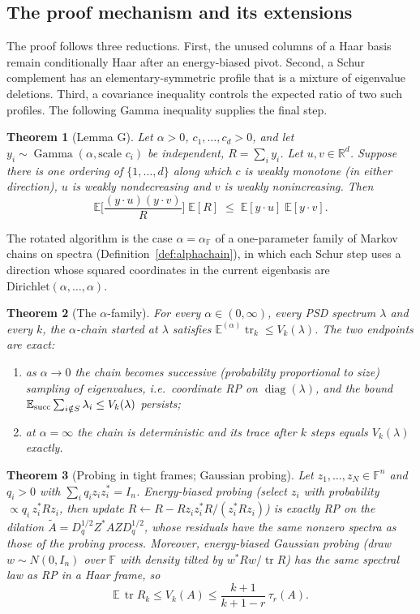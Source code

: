 \documentclass[11pt,a4paper]{article}
\newtheorem{mainthm}{Theorem}
\theoremstyle{definition}
\newcommand{\E}{\mathbb{E}}
\newcommand{\R}{\mathbb{R}}
\newcommand{\F}{\mathbb{F}}
\newcommand{\tr}{\operatorname{tr}}
\newcommand{\diag}{\operatorname{diag}}
\newcommand{\Gam}{\operatorname{Gamma}}
\begin{document}
\subsection{The proof mechanism and its extensions}

The proof follows three reductions. First, the unused columns of a Haar basis remain conditionally Haar after an energy-biased pivot. Second, a Schur complement has an elementary-symmetric profile that is a mixture of eigenvalue deletions. Third, a covariance inequality controls the expected ratio of two such profiles. The following Gamma inequality supplies the final step.

\begin{mainthm}[Lemma G]\label{thm:C}
Let $\alpha>0$, $c_1,\dots,c_d>0$, and let $y_i\sim\Gam(\alpha,\text{scale }c_i)$ be independent, $R=\sum_iy_i$. Let $u,v\in\R^d$. Suppose there is one ordering of $\{1,\dots,d\}$ along which $c$ is weakly monotone (in either direction), $u$ is weakly nondecreasing and $v$ is weakly nonincreasing. Then
\[
\E\Big[\frac{(y\cdot u)(y\cdot v)}{R}\Big]\;\E[R]\;\le\;\E[y\cdot u]\;\E[y\cdot v].
\]
\end{mainthm}

The rotated algorithm is the case $\alpha=\alpha_\F$ of a one-parameter family of Markov chains on spectra (Definition~\ref{def:alphachain}), in which each Schur step uses a direction whose squared coordinates in the current eigenbasis are $\mathrm{Dirichlet}(\alpha,\dots,\alpha)$.

\begin{mainthm}[The $\alpha$-family]\label{thm:D}
For every $\alpha\in(0,\infty)$, every PSD spectrum $\lambda$ and every $k$, the $\alpha$-chain started at $\lambda$ satisfies $\E^{(\alpha)}\tr_k\le V_k(\lambda)$. The two endpoints are exact:
\begin{enumerate}
\item[(i)] as $\alpha\to0$ the chain becomes successive (probability proportional to size) sampling of eigenvalues, i.e.\ coordinate RP on $\diag(\lambda)$, and the bound $\E_{\rm succ}\sum_{i\notin S}\lambda_i\le V_k(\lambda)$ persists;
\item[(ii)] at $\alpha=\infty$ the chain is deterministic and its trace after $k$ steps equals $V_k(\lambda)$ exactly.
\end{enumerate}
\end{mainthm}

\begin{mainthm}[Probing in tight frames; Gaussian probing]\label{thm:E}
Let $z_1,\dots,z_N\in\F^n$ and $q_i>0$ with $\sum_iq_iz_iz_i^*=I_n$. Energy-biased probing (select $z_i$ with probability $\propto q_i\,z_i^*Rz_i$, then update $R\leftarrow R-Rz_iz_i^*R/(z_i^*Rz_i)$) is exactly RP on the dilation $\widetilde A=D_q^{1/2}Z^*AZD_q^{1/2}$, whose residuals have the same nonzero spectra as those of the probing process. Moreover, energy-biased Gaussian probing (draw $w\sim N(0,I_n)$ over $\F$ with density tilted by $w^*Rw/\tr R$) has the same spectral law as RP in a Haar frame, so
\[
\E\,\tr R_k\le V_k(A)\le\frac{k+1}{k+1-r}\,\tau_r(A).
\]
\end{mainthm}
\end{document}
